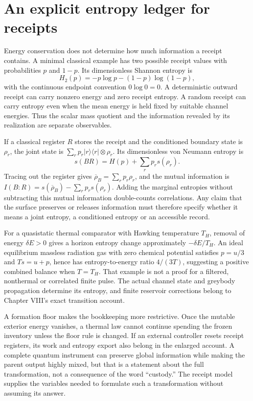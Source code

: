\section{An explicit entropy ledger for receipts}
Energy conservation does not determine how much information a receipt contains. A minimal classical example has two possible receipt values with probabilities $p$ and $1-p$. Its dimensionless Shannon entropy is
\begin{equation}
 H_2(p)=-p\log p-(1-p)\log(1-p),
 \label{c12:receiptentropy}
\end{equation}
with the continuous endpoint convention $0\log0=0$. A deterministic outward receipt can carry nonzero energy and zero receipt entropy. A random receipt can carry entropy even when the mean energy is held fixed by suitable channel energies. Thus the scalar mass quotient and the information revealed by its realization are separate observables.

If a classical register $R$ stores the receipt and the conditioned boundary state is $\rho_r$, the joint state is $\sum_r p_r|r\rangle\langle r|\otimes\rho_r$. Its dimensionless von Neumann entropy is
\begin{equation}
 s(BR)=H(p)+\sum_r p_rs(\rho_r).
 \label{c12:classicalquantumentropy}
\end{equation}
Tracing out the register gives $\overline\rho_B=\sum_rp_r\rho_r$, and the mutual information is $I(B:R)=s(\overline\rho_B)-\sum_rp_rs(\rho_r)$. Adding the marginal entropies without subtracting this mutual information double-counts correlations. Any claim that the surface preserves or releases information must therefore specify whether it means a joint entropy, a conditioned entropy or an accessible record.

For a quasistatic thermal comparator with Hawking temperature $T_H$, removal of energy $\delta E>0$ gives a horizon entropy change approximately $-\delta E/T_H$. An ideal equilibrium massless radiation gas with zero chemical potential satisfies $p=u/3$ and $Ts=u+p$, hence has entropy-to-energy ratio $4/(3T)$, suggesting a positive combined balance when $T=T_H$. That example is not a proof for a filtered, nonthermal or correlated finite pulse. The actual channel state and greybody propagation determine its entropy, and finite reservoir corrections belong to Chapter VIII's exact transition account.

A formation floor makes the bookkeeping more restrictive. Once the mutable exterior energy vanishes, a thermal law cannot continue spending the frozen inventory unless the floor rule is changed. If an external controller resets receipt registers, its work and entropy export also belong in the enlarged account. A complete quantum instrument can preserve global information while making the parent output highly mixed, but that is a statement about the full transformation, not a consequence of the word ``custody.'' The receipt model supplies the variables needed to formulate such a transformation without assuming its answer.

